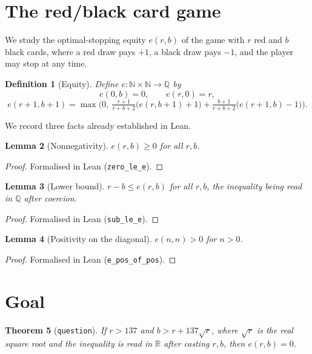 \documentclass{article}
\newtheorem{theorem}{Theorem}
\newtheorem{lemma}[theorem]{Lemma}
\newtheorem{definition}[theorem]{Definition}
\begin{document}
\section{The red/black card game}

We study the optimal-stopping equity $e(r,b)$ of the game with $r$ red and $b$
black cards, where a red draw pays $+1$, a black draw pays $-1$, and the player
may stop at any time.

\begin{definition}[Equity]\label{def:e}
\leanok
Define $e:\mathbb N\times\mathbb N\to\mathbb Q$ by
\[
  e(0,b)=0,\qquad e(r,0)=r,
\]
\[
  e(r+1,b+1)=\max\!\Big(0,\ \tfrac{r+1}{r+b+2}\big(e(r,b+1)+1\big)
                          +\tfrac{b+1}{r+b+2}\big(e(r+1,b)-1\big)\Big).
\]
\end{definition}

We record three facts already established in Lean.

\begin{lemma}[Nonnegativity]\label{lem:zero_le_e}
 \leanok
{}
$e(r,b)\ge 0$ for all $r,b$.
\end{lemma}
\begin{proof}
Formalised in Lean (\texttt{zero\_le\_e}).
\end{proof}

\begin{lemma}[Lower bound]\label{lem:sub_le_e}
\leanok
{}
$r-b\le e(r,b)$ for all $r,b$, the inequality being read in $\mathbb Q$ after
coercion.
\end{lemma}
\begin{proof}\leanok
Formalised in Lean (\texttt{sub\_le\_e}).
\end{proof}

\begin{lemma}[Positivity on the diagonal]\label{lem:e_pos}
\leanok
{}
$e(n,n)>0$ for $n>0$.
\end{lemma}
\begin{proof}\leanok
Formalised in Lean (\texttt{e\_pos\_of\_pos}).
\end{proof}

\section{Goal}

\begin{theorem}[\texttt{question}]\label{thm:question}
\leanok
{}
If $r>137$ and $b>r+137\sqrt r$, where $\sqrt r$ is the real square root and the
inequality is read in $\mathbb R$ after casting $r,b$, then $e(r,b)=0$.
\end{theorem}
\end{document}
